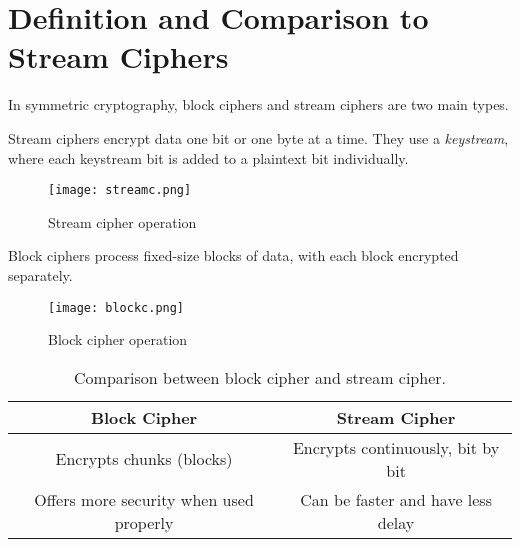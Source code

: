 \section{Definition and Comparison to Stream Ciphers}

In symmetric cryptography, block ciphers and stream ciphers are two main types.

Stream ciphers encrypt data one bit or one byte at a time. 
They use a \textit{keystream}, where each keystream bit is added to a plaintext bit individually.

\begin{figure}[h] %
    \centering
    \texttt{[image: streamc.png]}
    \caption{Stream cipher operation}
    \label{fig:stream_cipher}
\end{figure}

Block ciphers process fixed-size blocks of data, with each block encrypted separately.

\begin{figure}[h]
    \centering
    \texttt{[image: blockc.png]}
    \caption{Block cipher operation}
    \label{fig:block_cipher}
\end{figure}



\begin{table}[h]
\centering
\begin{tabular}{|c|c|}
\hline
\textbf{Block Cipher} & \textbf{Stream Cipher} \\
\hline
Encrypts chunks (blocks) & Encrypts continuously, bit by bit \\
\hline
Offers more security when used properly & Can be faster and have less delay \\
\hline
\end{tabular}
\caption{Comparison between block cipher and stream cipher.}
\label{tab:block_vs_stream}
\end{table}